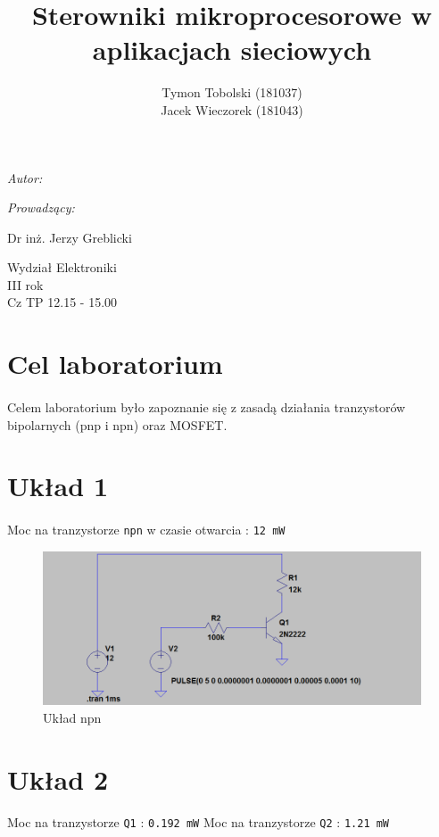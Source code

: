 \documentclass[wide,a4paper,titlepage,12pt] {article}
\title{Sterowniki mikroprocesorowe w aplikacjach sieciowych}
\author{Tymon Tobolski (181037)\\ Jacek Wieczorek (181043)}
\makeatletter
\renewcommand{\maketitle}{
\begin{titlepage}
  \begin{center}
    \vspace*{3cm}
    \LARGE \@title \par
    \vspace{2cm}
    \textit{\small Autor:}\par
    \normalsize \@author\par \normalsize
    \vspace{3cm}
    \textit{\small Prowadzący:}\par
    Dr inż. Jerzy Greblicki \par
    \vspace{2cm}
    Wydział Elektroniki\\ III rok\\ Cz TP 12.15 - 15.00\par

  \end{center}
\end{titlepage}
}
\makeatother
\begin{document}
\maketitle
  \section{Cel laboratorium}
  \paragraph{}
  Celem laboratorium było zapoznanie się z zasadą działania tranzystorów bipolarnych (pnp i npn) oraz MOSFET.

  \section{Układ 1}
  \paragraph{}
  Moc na tranzystorze \texttt{npn} w czasie otwarcia : \texttt{12 mW}

  \begin{figure}[h!]
  \begin{center}
  \includegraphics[scale=.5]{ukl1-npn.PNG}
  \caption{Układ npn}
  \label{fig:main}
  \end{center}
  \end{figure}  

\newpage

  \section{Układ 2}
  \paragraph{}
  Moc na tranzystorze \texttt{Q1} : \texttt{0.192 mW}
  Moc na tranzystorze \texttt{Q2} : \texttt{1.21 mW}
\end{document}
